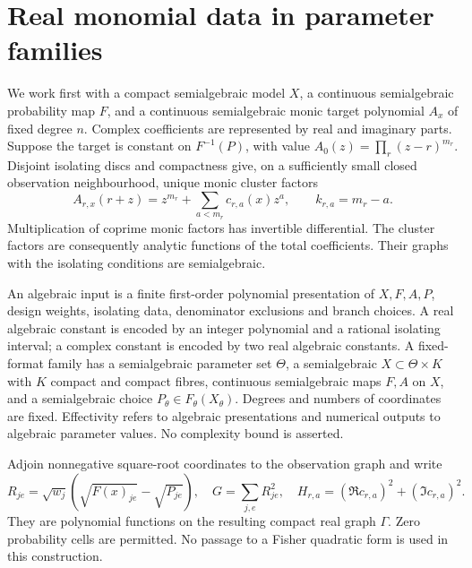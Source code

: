 \section{Real monomial data in parameter families}\label{sec:real}
We work first with a compact semialgebraic model $X$, a continuous
semialgebraic probability map $F$, and a continuous semialgebraic monic
target polynomial $A_x$ of fixed degree $n$. Complex coefficients are
represented by real and imaginary parts. Suppose the target is constant
on $F^{-1}(P)$, with value $A_0(z)=\prod_r(z-r)^{m_r}$. Disjoint
isolating discs and compactness give, on a sufficiently small closed
observation neighbourhood, unique monic cluster factors
\begin{equation}\label{eq:clusters}
 A_{r,x}(r+z)=z^{m_r}+\sum_{a<m_r}c_{r,a}(x)z^a,
 \qquad k_{r,a}=m_r-a.
\end{equation}
Multiplication of coprime monic factors has invertible differential.
The cluster factors are consequently analytic functions of the total
coefficients. Their graphs with the isolating conditions are semialgebraic.

\begin{definition}\label{def:input}
An algebraic input is a finite first-order polynomial presentation of
$X,F,A,P$, design weights, isolating data, denominator exclusions and
branch choices. A real algebraic constant is encoded by an integer
polynomial and a rational isolating interval; a complex constant is
encoded by two real algebraic constants. A fixed-format family has a
semialgebraic parameter set $\Theta$, a semialgebraic
$X\subset\Theta\times K$ with $K$ compact and compact fibres, continuous
semialgebraic maps $F,A$ on $X$, and a semialgebraic choice
$P_\theta\in F_\theta(X_\theta)$. Degrees and numbers of coordinates
are fixed. Effectivity refers to algebraic presentations and numerical
outputs to algebraic parameter values. No complexity bound is asserted.
\end{definition}

Adjoin nonnegative square-root coordinates to the observation graph and
write
\[
 R_{je}=\sqrt{w_j}(\sqrt{F(x)_{je}}-\sqrt{P_{je}}),\quad
 G=\sum_{j,e}R_{je}^2,\quad
 H_{r,a}=(\Re c_{r,a})^2+(\Im c_{r,a})^2.
\]
They are polynomial functions on the resulting compact real graph
$\Gamma$. Zero probability cells are permitted. No passage to a Fisher
quadratic form is used in this construction.

